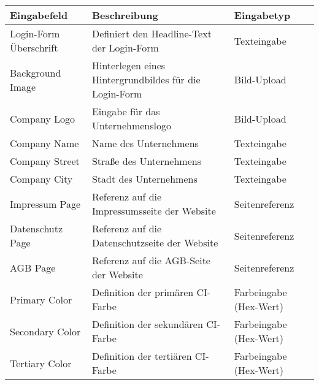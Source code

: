 \documentclass[
	ngerman,
	BCOR=8mm,
	headings=normal,
	parskip=half,
	headsepline,
	automark,
	listof=totoc,
	bibliography=totoc,
]{scrreprt}
\begin{document}
%

\cleardoublepage
{}


\cleardoublepage
{}
\tableofcontents
\listoftables
\listoffigures
\printglossary
\printglossary[type=\acronymtype, title={Abkürzungsverzeichnis}]
\printglossary[type=symbols, title={Symbolverzeichnis}]
%
\cleardoublepage
{}





%
\printbibliography[prenote=mynote]
%
\appendix
{}


\begin{table}[h]
    \centering
    \renewcommand{\arraystretch}{1.3}
    \begin{tabular}{|p{3cm}|p{6cm}|p{5cm}|}
        \hline
        \textbf{Eingabefeld} & \textbf{Beschreibung} & \textbf{Eingabetyp} \\
        \hline
        Login-Form Überschrift & Definiert den Headline-Text der Login-Form & Texteingabe \\
        \hline
        Background Image & Hinterlegen eines Hintergrundbildes für die Login-Form & Bild-Upload \\
        \hline
        Company Logo & Eingabe für das Unternehmenslogo & Bild-Upload \\
        \hline
        Company Name & Name des Unternehmens & Texteingabe \\
        \hline
        Company Street & Straße des Unternehmens & Texteingabe \\
        \hline
        Company City & Stadt des Unternehmens & Texteingabe \\
        \hline
        Impressum Page & Referenz auf die Impressumsseite der Website & Seitenreferenz \\
        \hline
        Datenschutz Page & Referenz auf die Datenschutzseite der Website & Seitenreferenz \\
        \hline
        AGB Page & Referenz auf die AGB-Seite der Website & Seitenreferenz \\
        \hline
        Primary Color & Definition der primären CI-Farbe & Farbeingabe (Hex-Wert) \\
        \hline
        Secondary Color & Definition der sekundären CI-Farbe & Farbeingabe (Hex-Wert) \\
        \hline
        Tertiary Color & Definition der tertiären CI-Farbe & Farbeingabe (Hex-Wert) \\

\end{tabular}
\end{table}
\end{document}
